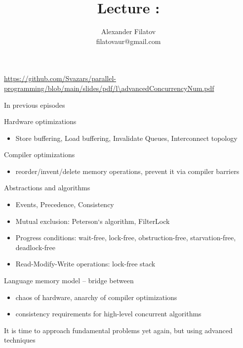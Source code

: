 


\newcommand{\thisLectureNum}{\advancedConcurrencyNum}


\title[]{Lecture \thisLectureNum: \advancedConcurrencyTopic}
\subtitle[]{\advancedConcurrencyKey}
\author[]{Alexander Filatov\\ filatovaur@gmail.com}

\date{}



\begin{frame}
  \titlepage
  \url{https://github.com/Svazars/parallel-programming/blob/main/slides/pdf/l\thisLectureNum.pdf}
\end{frame}


\begin{frame}{In previous episodes}

Hardware optimizations
\begin{itemize}
 \item Store buffering, Load buffering, Invalidate Queues, Interconnect topology
\end{itemize}

Compiler optimizations
\begin{itemize}
 \item reorder/invent/delete memory operations, prevent it via compiler barriers
\end{itemize}

Abstractions and algorithms
\begin{itemize} 
 \item Events, Precedence, Consistency
 \item Mutual exclusion: Peterson`s algorithm, FilterLock  
 \item Progress conditions: wait-free, lock-free, obstruction-free, starvation-free, deadlock-free 
 \item Read-Modify-Write operations: lock-free stack
\end{itemize}

Language memory model -- bridge between
\begin{itemize}  
    \item chaos of hardware, anarchy of compiler optimizations    
    \item consistency requirements for high-level concurrent algorithms       
\end{itemize}

\pause
It is time to approach fundamental problems yet again, but using advanced techniques

\end{frame}

